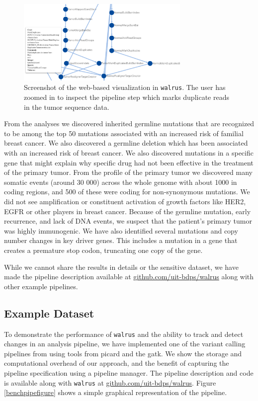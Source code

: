 \begin{figure}
    \centering
\includegraphics[width=8.3cm]{figures/webshot.png}
    \caption{Screenshot of the web-based visualization in \texttt{walrus}. The
    user has zoomed in to inspect the pipeline step which marks duplicate reads
    in the tumor sequence data.}
    \label{webshotfig}
\end{figure} 

From the analyses we discovered inherited germline mutations that are recognized
to be among the top 50 mutations associated with an increased risk of familial
breast cancer. We also discovered a germline deletion which has been associated
with an increased risk of breast cancer. We also discovered mutations in a
specific gene that might explain why specific drug had not been effective in the
treatment of the primary tumor. From the profile of the primary tumor we
discovered many somatic events (around 30 000) across the whole genome with
about 1000 in coding regions, and 500 of these were coding for non-synonymous
mutations.  We did not see amplification or constituent activation of growth
factors like HER2, EGFR or other players in breast cancer. Because of the
germline mutation, early recurrence, and lack of DNA events, we suspect that the
patient's primary tumor was highly immunogenic. We have also identified several
mutations and copy number changes in key driver genes. This includes a mutation
in a gene that creates a premature stop codon, truncating one copy of the gene.

While we cannot share the results in details or the sensitive dataset, we have
made the pipeline description available at \url{github.com/uit-bdps/walrus}
along with other example pipelines. 

\subsection{Example Dataset}
To demonstrate the performance of \texttt{walrus} and the ability to track and
detect changes in an analysis pipeline, we have implemented one of the variant
calling pipelines from \cite{cornish2015comparison} using tools from picard and
the \gls{gatk}. We show the storage and computational overhead of our approach,
and the benefit of capturing the pipeline specification using a pipeline
manager.  The pipeline description and code is available along with
\texttt{walrus} at \url{github.com/uit-bdps/walrus}. Figure
\ref{benchpipefigure} shows a simple graphical representation of the pipeline. 

